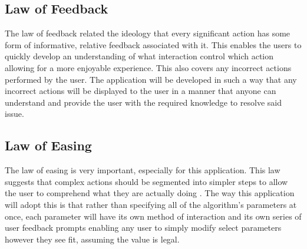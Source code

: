 \subsection{Law of Feedback}

The law of feedback related the ideology that every significant action has some form of informative, relative feedback associated with it\cite{99designs:laws}. This enables the users to quickly develop an understanding of what interaction control which action allowing for a more enjoyable experience. This also covers any incorrect actions performed by the user. The application will be developed in such a way that any incorrect actions will be displayed to the user in a manner that anyone can understand and provide the user with the required knowledge to resolve said issue.

\subsection{Law of Easing}

The law of easing is very important, especially for this application. This law suggests that complex actions should be segmented into simpler steps to allow the user to comprehend what they are actually doing \cite{99designs:laws}. The way this application will adopt this is that rather than specifying all of the algorithm’s parameters at once, each parameter will have its own method of interaction and its own series of user feedback prompts enabling any user to simply modify select parameters however they see fit, assuming the value is legal.

